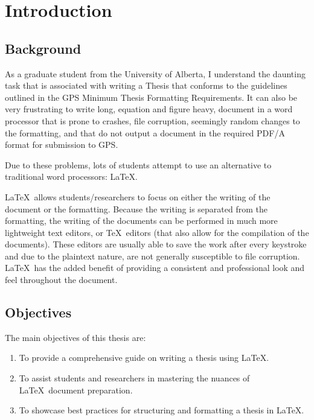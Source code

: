 \chapter{Introduction}\label{ch:Introduction}\section{Background}
	As a graduate student from the University of Alberta, I understand the daunting task that is associated with writing a Thesis that conforms to the guidelines outlined in the GPS Minimum Thesis Formatting Requirements. 
	It can also be very frustrating to write long, equation and figure heavy, document in a word processor that is prone to crashes, file corruption, seemingly random changes to the formatting, and that do not output a document in the required PDF/A format for submission to GPS.
	
	Due to these problems, lots of students attempt to use an alternative to traditional word processors: \LaTeX. 
	
	\LaTeX\ allows students/researchers to focus on either the writing of the document or the formatting. 
	Because the writing is separated from the formatting, the writing of the documents can be performed in much more lightweight text editors, or \TeX\ editors (that also allow for the compilation of the documents). 
	These editors are usually able to save the work after every keystroke and due to the plaintext nature, are not generally susceptible to file corruption.
	\LaTeX\ has the added benefit of providing a consistent and professional look and feel throughout the document. 

	\section{Objectives}
		The main objectives of this thesis are:
		\begin{enumerate}
			\item To provide a comprehensive guide on writing a thesis using \LaTeX.
			\item To assist students and researchers in mastering the nuances of \LaTeX\ document preparation.
			\item To showcase best practices for structuring and formatting a thesis in \LaTeX.
		\end{enumerate}

